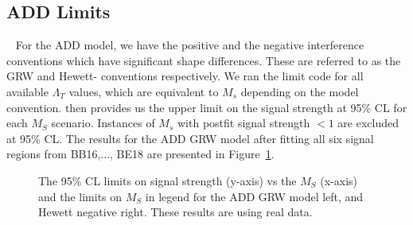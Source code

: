 \subsection{ADD Limits}~\label{sec:ADDlimits}
For the ADD model, we have the positive and the negative interference conventions which have significant shape differences. These are referred to as the GRW and Hewett- conventions respectively. We ran the limit code for all available $\Lambda_T$ values, which are equivalent to $M_s$ depending on the model convention. \THETA then provides us the upper limit on the signal strength at 95\% CL for each $M_S$ scenario. Instances of $M_s$ with postfit signal strength $<1$ are excluded at 95\% CL. The results for the ADD GRW model after fitting all six signal regions from BB16,..., BE18 are presented in Figure~\ref{fig:Limits_real}.

\begin{figure}[!htbp]{
\caption{The 95\% CL limits on signal strength (y-axis) vs the $M_S$ (x-axis) and the limits on $M_S$ in legend for the ADD GRW model left, and Hewett negative right. These results are using real data. }
\label{fig:Limits_real}}
\end{figure}

